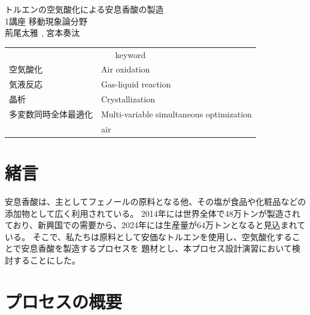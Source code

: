 \documentclass[a4j]{jsreport}
\begin{document}
\begin{titlepage}
\vspace{5cm}
\centering
{\Huge トルエンの空気酸化による安息香酸の製造}\\
\vspace{2cm}
\centering
{\Large 1講座 移動現象論分野}\\
\vspace{0.5cm}
\centering
{\large 荊尾太雅 , 宮本奏汰}\\
\vspace{3cm}
\begin{table}[htbp]
    \begin{center}
        \begin{tabular}[htbp]{ll}
            \multicolumn{2}{c}{{\LARGE keyword}}\\
            {\Large 空気酸化}&{\Large Air oxidation}\\
            {\Large 気液反応}&{\Large Gas-liquid reaction}\\
            {\Large 晶析}&{\Large Crystallization}\\
            {\Large 多変数同時全体最適化}&{\Large Multi-variable simultaneous optimization}\\
            {\Large }&{\Large air}\\
        \end{tabular}
    \end{center}
\end{table}

\end{titlepage}


\newpage
{}
\setcounter{tocdepth}{2}
\tableofcontents

\newpage

\chapter{緒言}
安息香酸は、主としてフェノールの原料となる他、その塩が食品や化粧品などの添加物として広く利用されている。
2014年には世界全体で48万トンが製造されており、新興国での需要から、2024年には生産量が64万トンとなると見込まれている。
そこで、私たちは原料として安価なトルエンを使用し、空気酸化することで安息香酸を製造するプロセスを
題材とし、本プロセス設計演習において検討することにした。

\newpage
\chapter{プロセスの概要}
\end{document}
